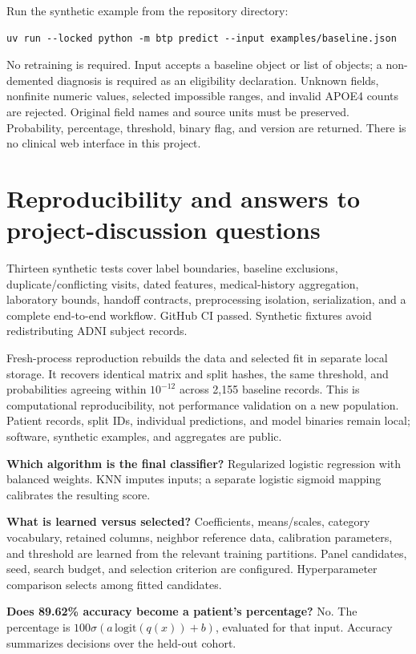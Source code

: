 Run the synthetic example from the repository directory:
\begin{verbatim}
uv run --locked python -m btp predict --input examples/baseline.json
\end{verbatim}
No retraining is required. Input accepts a baseline object or list of objects; a non-demented diagnosis is required as an eligibility declaration. Unknown fields, nonfinite numeric values, selected impossible ranges, and invalid APOE4 counts are rejected. Original field names and source units must be preserved. Probability, percentage, threshold, binary flag, and version are returned. There is no clinical web interface in this project.
\clearpage

\section{Reproducibility and answers to project-discussion questions}
Thirteen synthetic tests cover label boundaries, baseline exclusions, duplicate/conflicting visits, dated features, medical-history aggregation, laboratory bounds, handoff contracts, preprocessing isolation, serialization, and a complete end-to-end workflow. GitHub CI passed. Synthetic fixtures avoid redistributing ADNI subject records.

Fresh-process reproduction rebuilds the data and selected fit in separate local storage. It recovers identical matrix and split hashes, the same threshold, and probabilities agreeing within $10^{-12}$ across 2,155 baseline records. This is computational reproducibility, not performance validation on a new population. Patient records, split IDs, individual predictions, and model binaries remain local; software, synthetic examples, and aggregates are public.

\textbf{Which algorithm is the final classifier?} Regularized logistic regression with balanced weights. KNN imputes inputs; a separate logistic sigmoid mapping calibrates the resulting score.

\textbf{What is learned versus selected?} Coefficients, means/scales, category vocabulary, retained columns, neighbor reference data, calibration parameters, and threshold are learned from the relevant training partitions. Panel candidates, seed, search budget, and selection criterion are configured. Hyperparameter comparison selects among fitted candidates.

\textbf{Does 89.62\% accuracy become a patient's percentage?} No. The percentage is $100\sigma(a\,\mathrm{logit}(q(x))+b)$, evaluated for that input. Accuracy summarizes decisions over the held-out cohort.

